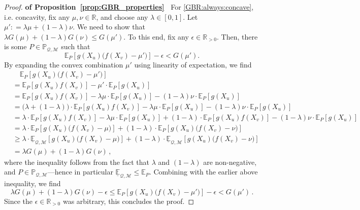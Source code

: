 \documentclass[twoside,11pt]{article}
\newcommand{\reals}{\mathbb{R}}
\newcommand{\realspos}{\reals_{>0}}
\newcommand{\lexp}{\underline{\mathbb{E}}_{\rateset,\mathcal{M}}}
\newcommand{\rateset}{\mathcal{Q}}
\newcommand{\coloneqq}{:\!=}
\begin{document}
\begin{proof}{\bf of Proposition~\ref{prop:GBR_properties}~}
For \ref{GBR:always:concave}, i.e. concavity, fix any $\mu,\nu\in\reals$, and choose any $\lambda\in[0,1]$. Let $\mu'\coloneqq \lambda\mu + (1-\lambda)\nu$. We need to show that $\lambda G(\mu) + (1-\lambda)G(\nu) \leq G(\mu')$. To this end, fix any $\epsilon\in\realspos$. Then, there is some $P\in\mathbb{P}_{\rateset,\mathcal{M}}$ such that
\begin{equation*}
\mathbb{E}_P\left[g(X_u)\bigl(f(X_v) - \mu'\bigr)\right] - \epsilon < G(\mu').
\end{equation*}
By expanding the convex combination $\mu'$ using linearity of expectation, we find
\begin{align*}
 &\quad \mathbb{E}_P\left[g(X_u)\bigl(f(X_v) - \mu'\bigr)\right] \\
 &= \mathbb{E}_P\left[g(X_u)f(X_v)\right] - \mu'\cdot\mathbb{E}_P\left[g(X_u)\right] \\
 &= \mathbb{E}_P\left[g(X_u)f(X_v)\right] - \lambda\mu\cdot\mathbb{E}_P\left[g(X_u)\right] - (1-\lambda)\nu\cdot\mathbb{E}_P\left[g(X_u)\right] \\
 &= \bigl(\lambda + (1-\lambda)\bigr)\cdot\mathbb{E}_P\left[g(X_u)f(X_v)\right] - \lambda\mu\cdot\mathbb{E}_P\left[g(X_u)\right] - (1-\lambda)\nu\cdot\mathbb{E}_P\left[g(X_u)\right] \\
 &= \lambda\cdot\mathbb{E}_P\left[g(X_u)f(X_v)\right] - \lambda\mu\cdot\mathbb{E}_P\left[g(X_u)\right] +(1-\lambda)\cdot\mathbb{E}_P\left[g(X_u)f(X_v)\right] - (1-\lambda)\nu\cdot\mathbb{E}_P\left[g(X_u)\right] \\
 &= \lambda\cdot\mathbb{E}_P\left[g(X_u)\bigl(f(X_v) - \mu\bigr)\right] + (1-\lambda)\cdot\mathbb{E}_P\left[g(X_u)\bigl(f(X_v) - \nu\bigr)\right] \\
 &\geq \lambda\cdot\lexp\left[g(X_u)\bigl(f(X_v) - \mu\bigr)\right] + (1-\lambda)\cdot\lexp\left[g(X_u)\bigl(f(X_v) - \nu\bigr)\right] \\
 &= \lambda G(\mu) + (1-\lambda) G(\nu)\,,
\end{align*}
where the inequality follows from the fact that $\lambda$ and $(1-\lambda)$ are non-negative, and $P\in\mathbb{P}_{\rateset,\mathcal{M}}$---hence in particular $\lexp\leq\mathbb{E}_P$.
Combining with the earlier above inequality, we find
\begin{equation*}
\lambda G(\mu) + (1-\lambda) G(\nu) -\epsilon \leq \mathbb{E}_P\left[g(X_u)\bigl(f(X_v) - \mu'\bigr)\right] - \epsilon < G(\mu')\,.
\end{equation*}
Since the $\epsilon\in\realspos$ was arbitrary, this concludes the proof.


\end{proof}
\end{document}
